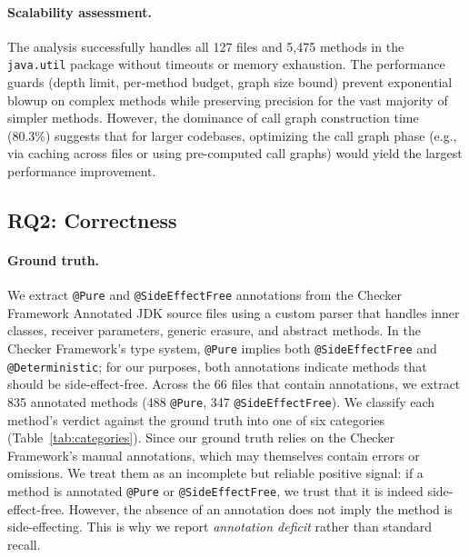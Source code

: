\paragraph{Scalability assessment.}
The analysis successfully handles all 127 files and 5,475 methods in the \texttt{java.util} package without timeouts or memory exhaustion.
The performance guards (depth limit, per-method budget, graph size bound) prevent exponential blowup on complex methods while preserving precision for the vast majority of simpler methods.
However, the dominance of call graph construction time (80.3\%) suggests that for larger codebases, optimizing the call graph phase (e.g., via caching across files or using pre-computed call graphs) would yield the largest performance improvement.


\subsection{RQ2: Correctness}


\paragraph{Ground truth.}
We extract \texttt{@Pure} and \texttt{@SideEffectFree} annotations from the Checker Framework Annotated JDK source files using a custom parser that handles inner classes, receiver parameters, generic erasure, and abstract methods.
In the Checker Framework's type system, \texttt{@Pure} implies both \texttt{@SideEffectFree} and \texttt{@Deterministic}; for our purposes, both annotations indicate methods that should be side-effect-free.
Across the 66 files that contain annotations, we extract 835 annotated methods (488 \texttt{@Pure}, 347 \texttt{@SideEffectFree}). We classify each method's verdict against the ground truth into one of six categories (Table~\ref{tab:categories}). Since our ground truth relies on the Checker Framework's manual annotations, which may themselves contain errors or omissions.
We treat them as an incomplete but reliable positive signal: if a method is annotated \texttt{@Pure} or \texttt{@SideEffectFree}, we trust that it is indeed side-effect-free.
However, the absence of an annotation does not imply the method is side-effecting.
This is why we report \emph{annotation deficit} rather than standard recall.

